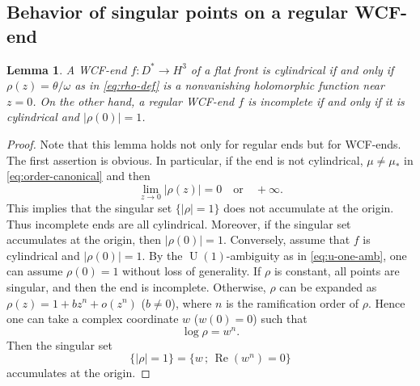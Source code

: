 \documentclass[a4paper]{amsart}
\theoremstyle{plain}
\newtheorem{lemma}[theorem]{Lemma}
\theoremstyle{remark}
\numberwithin{equation}{section}
\begin{document}
\subsection*{Behavior of singular points on a regular WCF-end}
\begin{lemma}\label{lem:incomplete}
 A WCF-end $f\colon{}D^*\to H^3$ of a flat front is 
 cylindrical if and only if $\rho(z)=\theta/\omega$
 as in \eqref{eq:rho-def} is a nonvanishing holomorphic function
 near $z=0$.
 On the other hand, a regular WCF-end $f$ is 
 incomplete if and only if
 it is cylindrical and $|\rho(0)|=1$.
\end{lemma}
\begin{proof}
 Note that this lemma holds not only for regular ends but for 
 WCF-ends.
 The first assertion is obvious.
 In particular, if the end is not cylindrical, $\mu\neq \mu_*$
 in \eqref{eq:order-canonical}
 and then
 \[
     \lim_{z\to 0} |\rho(z)|= 0 \quad\text{or}\quad
                              +\infty.
 \]
 This implies that the singular set $\{|\rho|=1\}$ does not 
 accumulate at the origin.
 Thus incomplete ends are all cylindrical.
 Moreover, if the singular set accumulates at the origin, then 
 $|\rho(0)|=1$.
 Conversely, assume that $f$ is cylindrical and $|\rho(0)|=1$.
 By the ${\operatorname{U}}(1)$-ambiguity as in \eqref{eq:u-one-amb}, one can
 assume $\rho(0)=1$ without loss of generality.
 If $\rho$ is constant, all points are singular, and
 then the end is incomplete.  Otherwise, $\rho$ 
 can be expanded as 
 $\rho(z)=1+b z^n +o(z^n)$ ($b\neq 0$),
 where $n$ is the ramification order of $\rho$.
 Hence one can take a complex coordinate  $w$ ($w(0)=0$)
 such that
 \begin{equation}\label{eq:rho-can}
     \log \rho = w^n.
 \end{equation}
 Then the singular set 
 \begin{equation}\label{eq:sing-norm}
      \{|\rho|=1\}=  \{w\,;\,{\operatorname{Re}} (w^n) = 0 \} 
 \end{equation}
 accumulates at the origin.
\end{proof}
\end{document}
